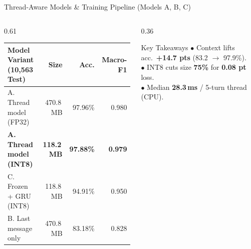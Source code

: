 \documentclass[aspectratio=169,10pt]{beamer}
\begin{document}
\begin{frame}{Thread-Aware Models \& Training Pipeline (Models A, B, C)}
\begin{center}
{%
  }
  \end{center}

  \vspace{0.18cm}
  \begin{columns}[c]
    \begin{column}{0.61\textwidth}
      \fontsize{6.7}{8.0}\selectfont
      \renewcommand{\arraystretch}{1.2}
      \setlength{\tabcolsep}{4.5pt}
      \begin{tabular}{@{}l r r r@{}}
        \toprule
        \textbf{Model Variant (10{,}563 Test)} & \textbf{Size} & \textbf{Acc.} & \textbf{Macro-F1} \\
        \midrule
        A. Thread model (FP32) & 470.8\,MB & 97.96\% & 0.980 \\
        \textbf{A. Thread model (INT8)} & \textbf{118.2\,MB} & \textbf{97.88\%} & \textbf{0.979} \\
        C. Frozen + GRU (INT8) & 118.8\,MB & 94.91\% & 0.950 \\
        B. Last message only & 470.8\,MB & 83.18\% & 0.828 \\
        \bottomrule
      \end{tabular}
    \end{column}
    \begin{column}{0.36\textwidth}
      \begin{accentcard}[snBlue]{Key Takeaways}
        \fontsize{6.7}{8.0}\selectfont
        $\bullet$ Context lifts acc.\ \textbf{+14.7 pts} (83.2 $\rightarrow$ 97.9\%).\\[2pt]
        $\bullet$ INT8 cuts size \textbf{75\%} for \textbf{0.08 pt} loss.\\[2pt]
        $\bullet$ Median \textbf{28.3\,ms} / 5-turn thread (CPU).
      \end{accentcard}
    \end{column}
  \end{columns}
\end{frame}
\end{document}
